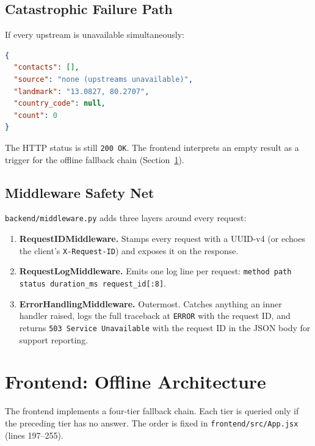 \documentclass[11pt, a4paper]{article}
\newcommand{\file}[1]{\texttt{\small\color{rsblue}#1}}
\newcommand{\code}[1]{\texttt{\small#1}}
\begin{document}
\subsection{Catastrophic Failure Path}

If every upstream is unavailable simultaneously:

\begin{lstlisting}[language=json,numbers=none,caption={Response when all upstreams fail}]
{
  "contacts": [],
  "source": "none (upstreams unavailable)",
  "landmark": "13.0827, 80.2707",
  "country_code": null,
  "count": 0
}
\end{lstlisting}

The HTTP status is still \texttt{200 OK}. The frontend interprets an empty result as a trigger for the offline fallback chain (Section~\ref{sec:offline}).

\subsection{Middleware Safety Net}

\file{backend/middleware.py} adds three layers around every request:

\begin{enumerate}[leftmargin=*, itemsep=2pt, topsep=2pt]
  \item \textbf{RequestIDMiddleware.} Stamps every request with a UUID-v4 (or echoes the client's \code{X-Request-ID}) and exposes it on the response.
  \item \textbf{RequestLogMiddleware.} Emits one log line per request: \code{method path status duration\_ms request\_id[:8]}.
  \item \textbf{ErrorHandlingMiddleware.} Outermost. Catches anything an inner handler raised, logs the full traceback at \texttt{ERROR} with the request ID, and returns \code{503 Service Unavailable} with the request ID in the JSON body for support reporting.
\end{enumerate}

\section{Frontend: Offline Architecture}
\label{sec:offline}

The frontend implements a four-tier fallback chain. Each tier is queried only if the preceding tier has no answer. The order is fixed in \file{frontend/src/App.jsx} (lines 197--255).
\end{document}
